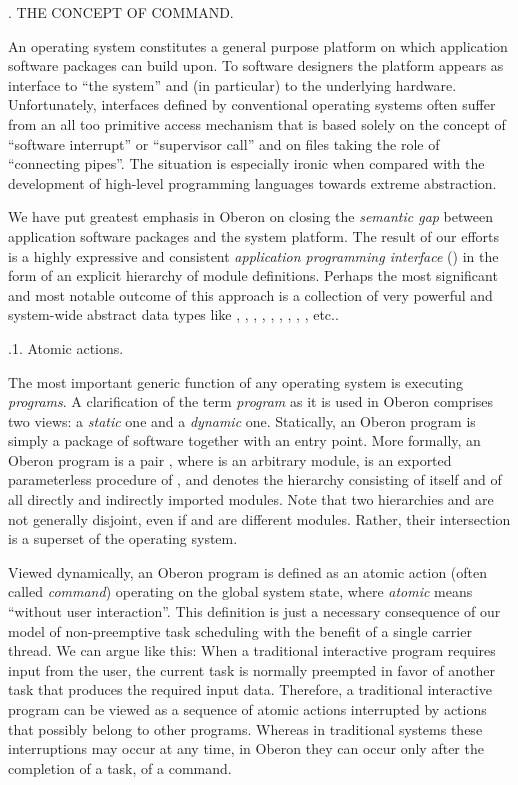 . THE CONCEPT OF COMMAND.

An operating system constitutes a general purpose platform on which
application software packages can build upon. To software designers
the platform appears as interface to ``the system'' and (in particular)
to the underlying hardware. Unfortunately, interfaces defined by
conventional operating systems often suffer from an all too primitive
access mechanism that is based solely on the concept of ``software interrupt''
or ``supervisor call'' and on files taking the role of
``connecting pipes''. The situation is especially ironic when compared
with the development of high-level programming languages towards
extreme abstraction.

We have put greatest emphasis in Oberon on closing the \emph{semantic gap}
between application software packages and the system platform. The
result of our efforts is a highly expressive and consistent
\emph{application programming interface} () in the form of an explicit
hierarchy of module definitions. Perhaps the most significant and most
notable outcome of this approach is a collection of very powerful and
system-wide abstract data types like
, , , , ,
, , , ,  etc..

.1. Atomic actions.

The most important generic function of any operating system is
executing \emph{programs}. A clarification of the term \emph{program} as it is used
in Oberon comprises two views: a \emph{static} one and a \emph{dynamic}
one. Statically, an Oberon program is simply a package of software
together with an entry point. More formally, an Oberon program is a
pair , where  is an arbitrary module,  is an exported
parameterless procedure of , and  denotes the hierarchy consisting
of  itself and of all directly and indirectly imported modules. Note
that two hierarchies  and  are not generally disjoint, even if 
and  are different modules. Rather, their intersection is a superset
of the operating system.

Viewed dynamically, an Oberon program is defined as an atomic action
(often called \emph{command}) operating on the global system state, where
\emph{atomic} means ``without user interaction''. This definition is just a
necessary consequence of our model of non-preemptive task scheduling
with the benefit of a single carrier thread. We can argue like this:
When a traditional interactive program requires input from the user,
the current task is normally preempted in favor of another task that
produces the required input data. Therefore, a traditional interactive
program can be viewed as a sequence of atomic actions interrupted by
actions that possibly belong to other programs. Whereas in traditional
systems these interruptions may occur at any time, in Oberon they can
occur only after the completion of a task, of a command.

